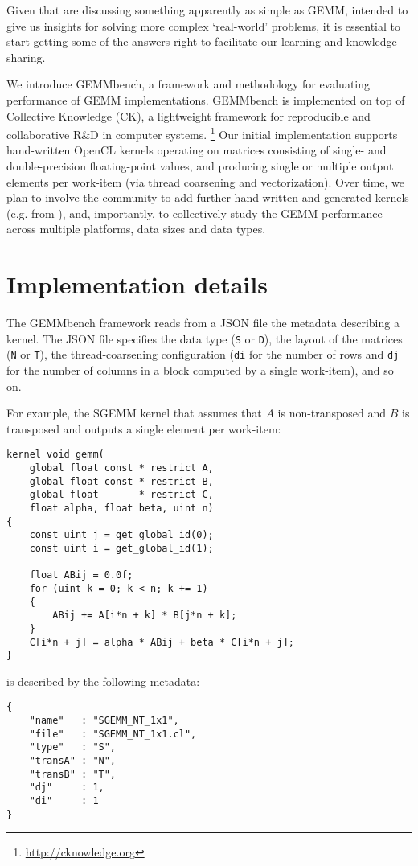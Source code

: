 \documentclass{acm_proc_article-sp} %
\begin{document}
Given that are discussing something apparently as simple as GEMM, intended to
give us insights for solving more complex `real-world' problems, it is
essential to start getting some of the answers right to facilitate our learning
and knowledge sharing.

We introduce GEMMbench, a framework and methodology for evaluating performance
of GEMM implementations.
%
GEMMbench is implemented on top of Collective Knowledge (CK), a lightweight
framework for reproducible and collaborative R\&D in computer systems.%
\footnote{\url{http://cknowledge.org}}
%
Our initial implementation supports hand-written OpenCL kernels operating on
matrices consisting of single- and double-precision floating-point values, and
producing single or multiple output elements per work-item (via thread
coarsening and vectorization).
%
Over time, we plan to involve the community to add further hand-written and
generated kernels (e.g. from \cite{Beaugnon:2014,Steuwer:2015}), and,
importantly, to collectively study the GEMM performance across multiple
platforms, data sizes and data types.


\section{Implementation details}
\label{sec:details}

%
The GEMMbench framework reads from a JSON file the metadata describing a
kernel.
%
The JSON file specifies the data type ({\tt S} or {\tt D}), the layout of the
matrices ({\tt N} or {\tt T}), the thread-coarsening configuration ({\tt di}
for the number of rows and {\tt dj} for the number of columns in a block
computed by a single work-item), and so on.

For example, the SGEMM kernel that assumes that $A$ is non-transposed and $B$
is transposed and outputs a single element per work-item:
%
\begin{verbatim}
kernel void gemm(
    global float const * restrict A,
    global float const * restrict B,
    global float       * restrict C,
    float alpha, float beta, uint n)
{
    const uint j = get_global_id(0);
    const uint i = get_global_id(1);

    float ABij = 0.0f;
    for (uint k = 0; k < n; k += 1)
    {
        ABij += A[i*n + k] * B[j*n + k];
    }
    C[i*n + j] = alpha * ABij + beta * C[i*n + j];
}
\end{verbatim}
%
is described by the following metadata:
%
\begin{verbatim}
{
    "name"   : "SGEMM_NT_1x1",
    "file"   : "SGEMM_NT_1x1.cl",
    "type"   : "S",
    "transA" : "N",
    "transB" : "T",
    "dj"     : 1,
    "di"     : 1
}
\end{verbatim}
\end{document}
